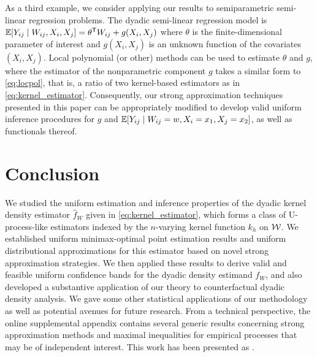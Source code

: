 As a third example, we consider applying our results to
semiparametric semi-linear regression problems.
The dyadic semi-linear regression model is
%
$\mathbb{E}[Y_{i j} \mid W_{i j}, X_i, X_j]
= \theta^{\mathsf{T}} W_{i j} + g(X_i, X_j)$
%
where $\theta$ is the finite-dimensional parameter
of interest
and $g(X_i, X_j)$ is an unknown
function of the covariates
$(X_i, X_j)$.
Local polynomial (or other) methods can be used to
estimate $\theta$ and $g$,
where the estimator of the nonparametric component
$g$ takes a similar form to \eqref{eq:locpol},
that is, a ratio of two kernel-based
estimators as in \eqref{eq:kernel_estimator}.
Consequently, our strong approximation techniques
presented in this paper can be appropriately modified
to develop valid uniform inference procedures for
$g$ and $\mathbb{E}[Y_{i j} \mid W_{i j}=w, X_i=x_1, X_j=x_2]$,
as well as functionals thereof.

\section{Conclusion}
\label{sec:conclusion}

We studied the uniform estimation and inference properties of the
dyadic kernel density estimator
$\hat{f}_W$ given in \eqref{eq:kernel_estimator},
which forms a class
of U-process-like estimators
indexed by the $n$-varying kernel function $k_h$ on $\mathcal{W}$.
We established uniform minimax-optimal point estimation results
and uniform distributional approximations for this estimator
based on novel strong approximation strategies.
We then applied these results to derive valid
and feasible uniform confidence bands for
the dyadic density estimand $f_W$,
and also developed a substantive application of our theory to
counterfactual dyadic density analysis.
We gave some other statistical
applications of our methodology as well as
potential avenues for future research.
From a technical perspective,
the online supplemental appendix contains several generic results
concerning strong approximation methods and maximal inequalities
for empirical processes that may be of independent interest.
This work has been presented as
%
\cite{%
  cattaneo2022talkgeorgia,%
  cattaneo2022talkcolumbia,%
  feng2022talkrenmin,%
  feng2022talkxiamen,%
  feng2023talkpeking,%
  feng2023talksingapore%
}.
